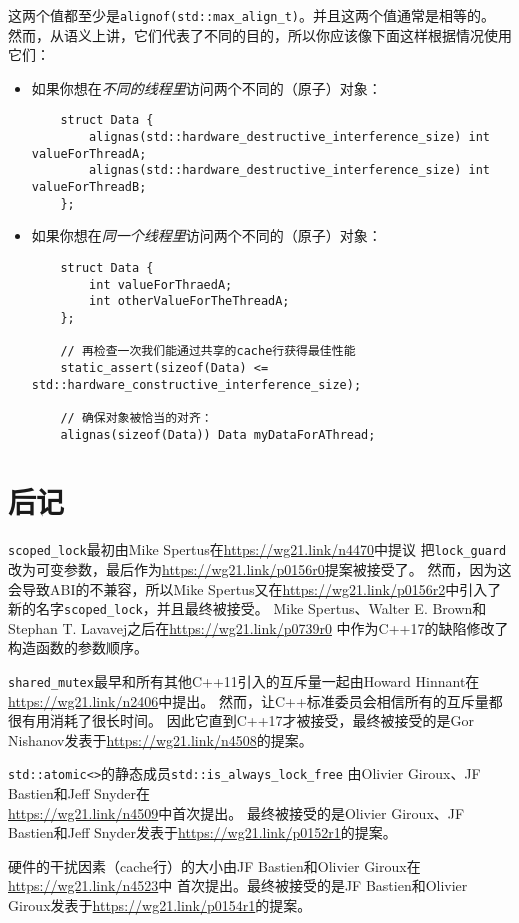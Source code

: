 这两个值都至少是\texttt{alignof(std::max\_align\_t)}。并且这两个值通常是相等的。
然而，从语义上讲，它们代表了不同的目的，所以你应该像下面这样根据情况使用它们：
\begin{itemize}
    \item 如果你想在\emph{不同的线程里}访问两个不同的（原子）对象：
    \begin{lstlisting}
    struct Data {
        alignas(std::hardware_destructive_interference_size) int valueForThreadA;
        alignas(std::hardware_destructive_interference_size) int valueForThreadB;
    };
    \end{lstlisting}
    \item 如果你想在\emph{同一个线程里}访问两个不同的（原子）对象：
    \begin{lstlisting}
    struct Data {
        int valueForThraedA;
        int otherValueForTheThreadA;
    };

    // 再检查一次我们能通过共享的cache行获得最佳性能
    static_assert(sizeof(Data) <= std::hardware_constructive_interference_size);

    // 确保对象被恰当的对齐：
    alignas(sizeof(Data)) Data myDataForAThread;
    \end{lstlisting}
\end{itemize}

\section{后记}
\texttt{scoped\_lock}最初由Mike Spertus在\url{https://wg21.link/n4470}中提议
把\texttt{lock\_guard}改为可变参数，最后作为\url{https://wg21.link/p0156r0}提案被接受了。
然而，因为这会导致ABI的不兼容，所以Mike Spertus又在\url{https://wg21.link/p0156r2}中引入了
新的名字\texttt{scoped\_lock}，并且最终被接受。
Mike Spertus、Walter E. Brown和Stephan T. Lavavej之后在\url{https://wg21.link/p0739r0}
中作为C++17的缺陷修改了构造函数的参数顺序。

\texttt{shared\_mutex}最早和所有其他C++11引入的互斥量一起由Howard Hinnant在
\url{https://wg21.link/n2406}中提出。
然而，让C++标准委员会相信所有的互斥量都很有用消耗了很长时间。
因此它直到C++17才被接受，最终被接受的是Gor Nishanov发表于\url{https://wg21.link/n4508}的提案。

\texttt{std::atomic<>}的静态成员\texttt{std::is\_always\_lock\_free}
由Olivier Giroux、JF Bastien和Jeff Snyder在\\
\url{https://wg21.link/n4509}中首次提出。
最终被接受的是Olivier Giroux、JF Bastien和Jeff Snyder发表于\url{https://wg21.link/p0152r1}的提案。

硬件的干扰因素（cache行）的大小由JF Bastien和Olivier Giroux在\url{https://wg21.link/n4523}中
首次提出。最终被接受的是JF Bastien和Olivier Giroux发表于\url{https://wg21.link/p0154r1}的提案。

